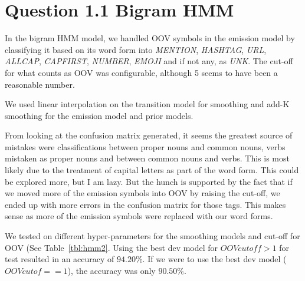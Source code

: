 \documentclass[11pt]{article}
\begin{document}
\section*{Question 1.1 Bigram HMM}

\bigskip

In the bigram  HMM model, we handled OOV symbols in the emission model by classifying it based on its word form into \textit{MENTION}, \textit{HASHTAG}, \textit{URL}, \textit{ALLCAP}, \textit{CAPFIRST}, \textit{NUMBER}, \textit{EMOJI} and if not any, as \textit{UNK}. The cut-off for what counts as OOV was configurable, although 5 seems to have been a reasonable number. 

\bigskip

We used linear interpolation on the transition model for smoothing and add-K smoothing for the emission model and prior models. 

\bigskip

From looking at the confusion matrix generated, it seems the greatest source of mistakes were classifications between proper nouns and common nouns, verbs mistaken as proper nouns and between common nouns and verbs. This is most likely due to the treatment of capital letters as part of the word form. This could be explored more, but I am lazy. But the hunch is supported by the fact that if we moved more of the emission symbols into OOV by raising the cut-off, we ended up with more errors in the confusion matrix for those tags. This makes sense as more of the emission symbols were replaced with our word forms.  

\bigskip

We tested on different hyper-parameters for the smoothing models and cut-off for OOV (See Table~\ref{tbl:hmm2}. Using the best dev model for $OOV cutoff > 1$ for test resulted in an accuracy of $94.20\%$. If we were to use the best dev model ($OOV cutof == 1$),  the accuracy was only $90.50\%$.
\end{document}
